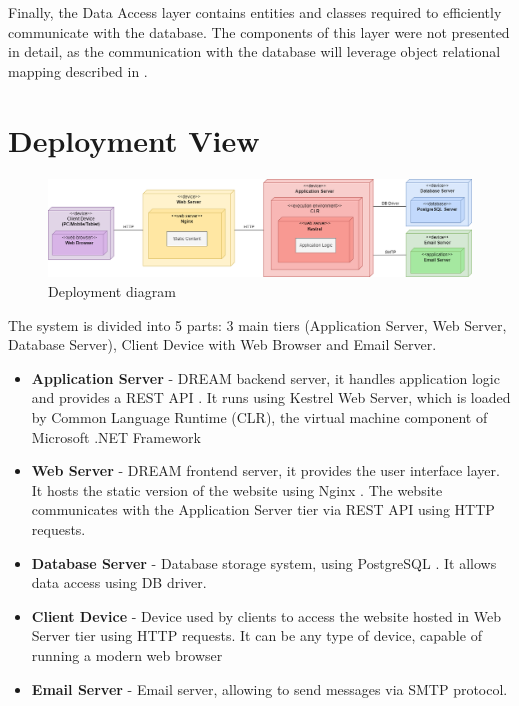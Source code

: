 Finally, the Data Access layer contains entities and classes required to efficiently communicate with the database. The components of this layer were not presented in detail, as the communication with the database will leverage object relational mapping described in .

\section{Deployment View}
\begin{figure}[H]
    \centering
    \includegraphics[width=\textwidth]{diagrams/deployment.png}
    \caption{Deployment diagram}
    \label{fig:deployment}
\end{figure}
The system is divided into 5 parts: 3 main tiers  (Application Server, Web Server, Database Server), Client Device with Web Browser and Email Server.
\begin{itemize}
    \item \textbf{Application Server} - DREAM backend server, it handles application logic and provides a REST API \cite{rest}. It runs using Kestrel Web Server, which is loaded by Common Language Runtime (CLR), the virtual machine component of Microsoft .NET Framework 
    \item \textbf{Web Server} - DREAM frontend server, it provides the user interface layer. It hosts the static version of the website using Nginx \cite{nginx}. The website communicates with the Application Server tier via REST API using HTTP requests.
    \item \textbf{Database Server} - Database storage system, using PostgreSQL \cite{postgresql}. It allows data access using DB driver. 
    \item \textbf{Client Device} - Device used by clients to access the website hosted in Web Server tier using HTTP requests. It can be any type of device, capable of running a modern web browser
    \item \textbf{Email Server} - Email server, allowing to send messages via SMTP protocol.
\end{itemize}



